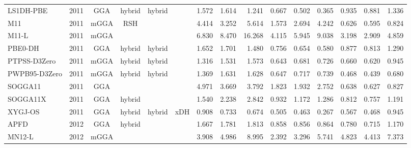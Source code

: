\begin{landscape}
\begin{longtable}{ll:cccc:rrr:rrr:rrr}
    LS1DH-PBE        & 2011 & GGA  & hybrid   & hybrid      &           & 1.572             & 1.614             & 1.241  & 0.667              & 0.502             & 0.365  & 0.935   & 0.881 & 1.336 \\
    M11              & 2011 & mGGA & RSH      &             &           & 4.414             & 3.252             & 5.614  & 1.573              & 2.694             & 4.242  & 0.626   & 0.595 & 0.824 \\
    M11-L            & 2011 & mGGA &          &             &           & 6.830             & 8.470             & 16.268 & 4.115              & 5.945             & 9.038  & 3.198   & 2.909 & 4.859 \\
    PBE0-DH          & 2011 & GGA  & hybrid   & hybrid      &           & 1.652             & 1.701             & 1.480  & 0.756              & 0.654             & 0.580  & 0.877   & 0.813 & 1.290 \\
    PTPSS-D3Zero     & 2011 & mGGA & hybrid   & hybrid      &           & 1.316             & 1.531             & 1.573  & 0.643              & 0.681             & 0.726  & 0.660   & 0.620 & 0.945 \\
    PWPB95-D3Zero    & 2011 & mGGA & hybrid   & hybrid      &           & 1.369             & 1.631             & 1.628  & 0.647              & 0.717             & 0.739  & 0.468   & 0.439 & 0.680 \\
    SOGGA11          & 2011 & GGA  &          &             &           & 4.971             & 3.669             & 3.792  & 1.823              & 1.932             & 2.752  & 0.638   & 0.627 & 0.827 \\
    SOGGA11X         & 2011 & GGA  & hybrid   &             &           & 1.540             & 2.238             & 2.842  & 0.932              & 1.172             & 1.286  & 0.812   & 0.757 & 1.191 \\
    XYGJ-OS          & 2011 & GGA  & hybrid   & hybrid      & xDH       & 0.908             & 0.733             & 0.674  & 0.505              & 0.463             & 0.267  & 0.567   & 0.468 & 0.945 \\
    APFD             & 2012 & GGA  & hybrid   &             &           & 1.667             & 1.781             & 1.813  & 0.858              & 0.856             & 0.864  & 0.780   & 0.715 & 1.170 \\
    MN12-L           & 2012 & mGGA &          &             &           & 3.908             & 4.986             & 8.995  & 2.392              & 3.296             & 5.741  & 4.823   & 4.413 & 7.373 \\

\end{longtable}
\end{landscape}
